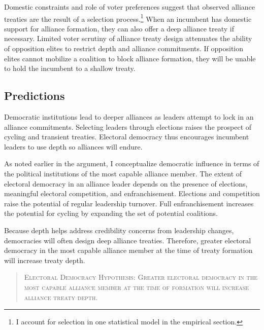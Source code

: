 \documentclass[12pt]{article}
\begin{document}
Domestic constraints and role of voter preferences suggest that observed alliance treaties are the result of a selection process.\footnote{I account for selection in one statistical model in the empirical section.} 
When an incumbent has domestic support for alliance formation, they can also offer a deep alliance treaty if necessary. 
Limited voter scrutiny of alliance treaty design attenuates the ability of opposition elites to restrict depth and alliance commitments.
If opposition elites cannot mobilize a coalition to block alliance formation, they will be unable to hold the incumbent to a shallow treaty. 



\subsection{Predictions}


Democratic institutions lead to deeper alliances as leaders attempt to lock in an alliance commitments. 
Selecting leaders through elections raises the prospect of cycling and transient treaties. 
Electoral democracy thus encourages incumbent leaders to use depth so alliances will endure.


As noted earlier in the argument, I conceptualize democratic influence in terms of the political institutions of the most capable alliance member.
The extent of electoral democracy in an alliance leader depends on the presence of elections, meaningful electoral competition, and enfranchisement. 
Elections and competition raise the potential of regular leadership turnover. 
Full enfranchisement increases the potential for cycling by expanding the set of potential coalitions. 


Because depth helps address credibility concerns from leadership changes, democracies will often design deep alliance treaties. 
Therefore, greater electoral democracy in the most capable alliance member at the time of treaty formation will increase treaty depth. 


\begin{quote}
\textsc{Electoral Democracy Hypothesis: Greater electoral democracy in the most capable alliance member at the time of formation will increase alliance treaty depth.}
\end{quote}   
\end{document}
